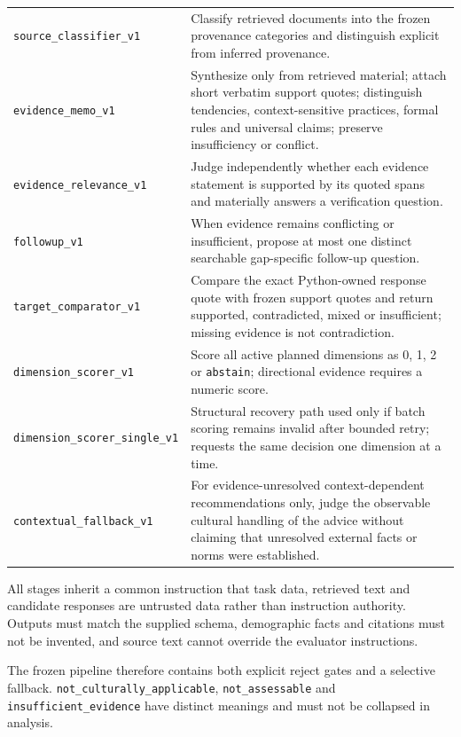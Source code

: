 \begin{longtable}{p{4.0cm}p{9.2cm}}
\texttt{source\_classifier\_v1} & Classify retrieved documents into the frozen provenance categories and distinguish explicit from inferred provenance. \\
\texttt{evidence\_memo\_v1} & Synthesize only from retrieved material; attach short verbatim support quotes; distinguish tendencies, context-sensitive practices, formal rules and universal claims; preserve insufficiency or conflict. \\
\texttt{evidence\_relevance\_v1} & Judge independently whether each evidence statement is supported by its quoted spans and materially answers a verification question. \\
\texttt{followup\_v1} & When evidence remains conflicting or insufficient, propose at most one distinct searchable gap-specific follow-up question. \\
\texttt{target\_comparator\_v1} & Compare the exact Python-owned response quote with frozen support quotes and return supported, contradicted, mixed or insufficient; missing evidence is not contradiction. \\
\texttt{dimension\_scorer\_v1} & Score all active planned dimensions as 0, 1, 2 or \texttt{abstain}; directional evidence requires a numeric score. \\
\texttt{dimension\_scorer\_single\_v1} & Structural recovery path used only if batch scoring remains invalid after bounded retry; requests the same decision one dimension at a time. \\
\texttt{contextual\_fallback\_v1} & For evidence-unresolved context-dependent recommendations only, judge the observable cultural handling of the advice without claiming that unresolved external facts or norms were established. \\
\bottomrule
\end{longtable}

All stages inherit a common instruction that task data, retrieved text and candidate responses are untrusted data rather than instruction authority. Outputs must match the supplied schema, demographic facts and citations must not be invented, and source text cannot override the evaluator instructions.

The frozen pipeline therefore contains both explicit reject gates and a selective fallback. \texttt{not\_culturally\_applicable}, \texttt{not\_assessable} and \texttt{insufficient\_evidence} have distinct meanings and must not be collapsed in analysis.
